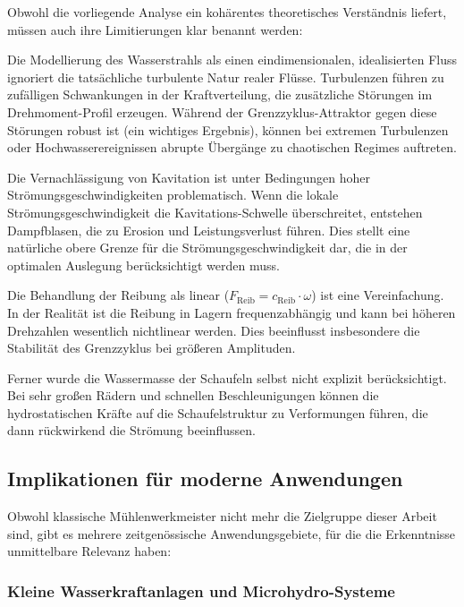 \documentclass[a4paper,12pt]{article}
\theoremstyle{definition}
\begin{document}
Obwohl die vorliegende Analyse ein kohärentes theoretisches Verständnis liefert, müssen auch ihre Limitierungen klar benannt werden:

Die Modellierung des Wasserstrahls als einen eindimensionalen, idealisierten Fluss ignoriert die tatsächliche turbulente Natur realer Flüsse. Turbulenzen führen zu zufälligen Schwankungen in der Kraftverteilung, die zusätzliche Störungen im Drehmoment-Profil erzeugen. Während der Grenzzyklus-Attraktor gegen diese Störungen robust ist (ein wichtiges Ergebnis), können bei extremen Turbulenzen oder Hochwasserereignissen abrupte Übergänge zu chaotischen Regimes auftreten.

Die Vernachlässigung von Kavitation ist unter Bedingungen hoher Strömungsgeschwindigkeiten problematisch. Wenn die lokale Strömungsgeschwindigkeit die Kavitations-Schwelle überschreitet, entstehen Dampfblasen, die zu Erosion und Leistungsverlust führen. Dies stellt eine natürliche obere Grenze für die Strömungsgeschwindigkeit dar, die in der optimalen Auslegung berücksichtigt werden muss.

Die Behandlung der Reibung als linear ($F_{\text{Reib}} = c_{\text{Reib}} \cdot \omega$) ist eine Vereinfachung. In der Realität ist die Reibung in Lagern frequenzabhängig und kann bei höheren Drehzahlen wesentlich nichtlinear werden. Dies beeinflusst insbesondere die Stabilität des Grenzzyklus bei größeren Amplituden.

Ferner wurde die Wassermasse der Schaufeln selbst nicht explizit berücksichtigt. Bei sehr großen Rädern und schnellen Beschleunigungen können die hydrostatischen Kräfte auf die Schaufelstruktur zu Verformungen führen, die dann rückwirkend die Strömung beeinflussen.

\subsection{Implikationen für moderne Anwendungen}

Obwohl klassische Mühlenwerkmeister nicht mehr die Zielgruppe dieser Arbeit sind, gibt es mehrere zeitgenössische Anwendungsgebiete, für die die Erkenntnisse unmittelbare Relevanz haben:

\subsubsection*{Kleine Wasserkraftanlagen und Microhydro-Systeme}
\end{document}
